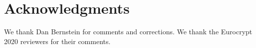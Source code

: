 \documentclass[11pt,twoside]{article}
\begin{document}
\setlength{\abovedisplayskip}{4pt}
\setlength{\belowdisplayskip}{4pt}











\section{Acknowledgments}

We thank Dan Bernstein for comments and corrections. We thank the Eurocrypt 2020 reviewers for their comments.

\appendix
\end{document}
